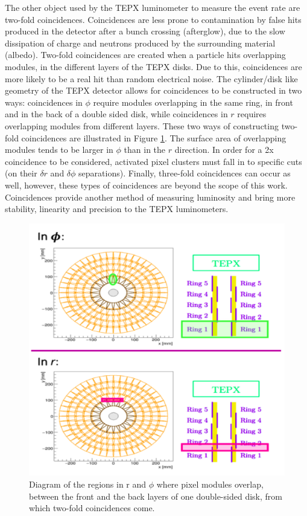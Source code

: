 The other object used by the TEPX luminometer to measure the event rate are two-fold coincidences. Coincidences are less prone to contamination by false hits produced in the detector after a bunch crossing (afterglow), due to the slow dissipation of charge and neutrons produced by the surrounding material (albedo). Two-fold coincidences are created when a particle hits overlapping modules, in the different layers of the TEPX disks. Due to this, coincidences are more likely to be a real hit than random electrical noise. The cylinder/disk like geometry of the TEPX detector allows for coincidences to be constructed in two ways: coincidences in $\phi$ require modules overlapping in the same ring, in front and in the back of a double sided disk, while coincidences in $r$ requires overlapping modules from different layers. These two ways of constructing two-fold coincidences are illustrated in Figure \ref{3x2x}. The surface area of overlapping modules tends to be larger in $\phi$ than in the $r$ direction. In order for a 2x coincidence to be considered, activated pixel clusters must fall in to specific cuts (on their $\delta r$ and $\delta \phi$ separations). Finally, three-fold coincidences can occur as well, however, these types of coincidences are beyond the scope of this work.\\
Coincidences provide another method of measuring luminosity and bring more stability, linearity and precision to the TEPX luminometers.
\begin{center}
\begin{figure}[H]
    \centering
    \includegraphics[scale=.4]{Chapter3/3x2x.png}
    \caption[Regions where two-fold coincidences can occur in r and $\phi$.  ]{Diagram of the regions in r and $\phi$ where pixel modules overlap, between the front and the back layers of one double-sided disk, from which two-fold coincidences come. }
    \label{3x2x}
\end{figure}
\end{center}

